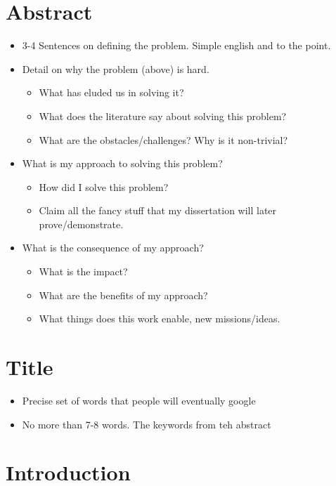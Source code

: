 
\chapter{Abstract}
\begin{itemize}
    \item 3-4 Sentences on defining the problem.
        Simple english and to the point.
    \item Detail on why the problem (above) is hard.
        \begin{itemize}
            \item What has eluded us in solving it?
            \item What does the literature say about solving this problem?
            \item What are the obstacles/challenges? Why is it non-trivial?
        \end{itemize}
    \item What is my approach to solving this problem?
        \begin{itemize}
            \item How did I solve this problem?
            \item Claim all the fancy stuff that my dissertation will later prove/demonstrate.
        \end{itemize}
    \item What is the consequence of my approach?
        \begin{itemize}
            \item What is the impact?
            \item What are the benefits of my approach?
            \item What things does this work enable, new missions/ideas.
        \end{itemize}
\end{itemize}

\chapter{Title}
\begin{itemize}
    \item Precise set of words that people will eventually google
    \item No more than 7-8 words. The keywords from teh abstract
\end{itemize}
\chapter{Introduction}

